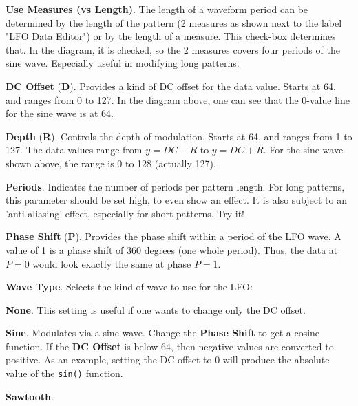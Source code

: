    \begin{enumber}
      \item \textbf{Use Measures (vs Length)}.
         The length of a waveform period can be determined by the length of the
         pattern (2 measures as shown next to the label "LFO Data Editor") or
         by the length of a measure. This check-box determines that.
         In the diagram, it is checked, so the 2 measures covers four periods
         of the sine wave.
         Especially useful in modifying long patterns.
      \item \textbf{DC Offset} (\textbf{D}).
         Provides a kind of DC offset for the data value. Starts at 64, and
         ranges from 0 to 127.
         In the diagram above, one can see that the 0-value line for the sine
         wave is at 64.
      \item \textbf{Depth} (\textbf{R}).
         Controls the depth of modulation.
         Starts at 64, and ranges from 1 to 127.
         The data values range from \( y = DC - R \) to \( y = DC + R\).
         For the sine-wave shown above, the range is 0 to 128 (actually 127).
      \item \textbf{Periods}.
         Indicates the number of periods per pattern length.
         For long patterns, this parameter should be set high,
         to even show an effect.  It is also subject to an 'anti-aliasing'
         effect, especially for short patterns.
         Try it!
      \item \textbf{Phase Shift} (\textbf{P}).
         Provides the phase shift within a period of the LFO wave.
         A value of 1 is a phase shift of 360 degrees (one whole period).
         Thus, the data at \( P = 0 \) would look exactly the same at phase
         \( P = 1\).
      \item \textbf{Wave Type}.
         Selects the kind of wave to use for the LFO:
         \begin{enumber}
            \item \textbf{None}.
               This setting is useful if one wants to change only the DC
               offset.
            \item \textbf{Sine}.
               Modulates via a sine wave.
               Change the \textbf{Phase Shift} to get a cosine function.
               If the \textbf{DC Offset} is below 64, then negative values are
               converted to positive. As an example, setting the DC offset to 0
               will produce the absolute value of the \texttt{sin()} function.
            \item \textbf{Sawtooth}.

\end{enumber}
\end{enumber}
